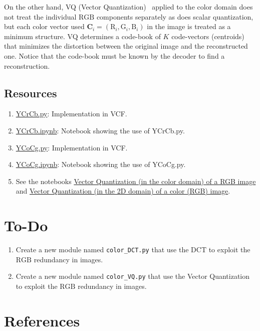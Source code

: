 On the other hand, VQ (Vector
Quantization)~\cite{vruiz__vector_quantization,sayood2017introduction}
applied to the color domain does not treat the individual $\text{RGB}$
components separately as does scalar quantization, but each color
vector used ${\mathbf C}_i = (\text{R}_i, \text{G}_i, \text{B}_i )$ in
the image is treated as a minimum structure. VQ determines a code-book
of $K$ code-vectors (centroids) that minimizes the distortion between
the original image and the reconstructed one. Notice that the
code-book must be known by the decoder to find a reconstruction.

\subsection*{Resources}
\begin{enumerate}
\item \href{}{YCrCb.py}: Implementation in VCF.
\item \href{https://github.com/Sistemas-Multimedia/VCF/blob/main/notebooks/YCrCb.ipynb}{YCrCb.ipynb}: Notebook showing the use of YCrCb.py.
\item \href{}{YCoCg.py}: Implementation in VCF. 
\item \href{https://github.com/Sistemas-Multimedia/VCF/blob/main/notebooks/YCoCg.ipynb}{YCoCg.ipynb}: Notebook showing the use of YCoCg.py.
\item See the notebooks
\href{https://github.com/vicente-gonzalez-ruiz/vector_quantization/blob/main/docs/RGB_VQ.ipynb}{Vector
  Quantization (in the color domain) of a RGB image} and
\href{https://github.com/vicente-gonzalez-ruiz/vector_quantization/blob/main/docs/spatial_color_VQ.ipynb}{Vector
  Quantization (in the 2D domain) of a color (RGB) image}.
\end{enumerate}

\section*{To-Do}
\begin{enumerate}
\item Create a new module named \texttt{color\_DCT.py} that use the
  $\text{DCT}$ to exploit the $\text{RGB}$ redundancy in images.
\item Create a new module named \texttt{color\_VQ.py} that use the
  Vector Quantization to exploit the $\text{RGB}$ redundancy in images.
\end{enumerate}

\section{References}

\renewcommand{\addcontentsline}[3]{}%

